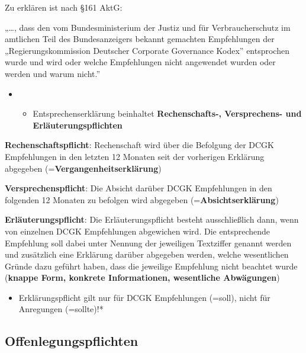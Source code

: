 \documentclass[
]{article}
\providecommand{\tightlist}{%
  \setlength{\itemsep}{0pt}\setlength{\parskip}{0pt}}
\begin{document}
Zu erklären ist nach §161 AktG:

„\ldots, dass den vom Bundesministerium der Justiz und für
Verbraucherschutz im amtlichen Teil des Bundesanzeigers bekannt
gemachten Empfehlungen der „Regierungskommission Deutscher Corporate
Governance Kodex'' entsprochen wurde und wird oder welche Empfehlungen
nicht angewendet wurden oder werden und warum nicht.''

\begin{itemize}
\item
  \begin{itemize}
  \tightlist
  \item
    Entsprechenserklärung beinhaltet \textbf{Rechenschafts-,
    Versprechens- und Erläuterungspflichten}
  \end{itemize}
\end{itemize}

\textbf{Rechenschaftspflicht}: Rechenschaft wird über die Befolgung der
DCGK Empfehlungen in den letzten 12 Monaten seit der vorherigen
Erklärung abgegeben (=\textbf{Vergangenheitserklärung})

\textbf{Versprechenspflicht}: Die Absicht darüber DCGK Empfehlungen in
den folgenden 12 Monaten zu befolgen wird abgegeben
(=\textbf{Absichtserklärung})

\textbf{Erläuterungspflicht}: Die Erläuterungspflicht besteht
ausschließlich dann, wenn von einzelnen DCGK Empfehlungen abgewichen
wird. Die entsprechende Empfehlung soll dabei unter Nennung der
jeweiligen Textziffer genannt werden und zusätzlich eine Erklärung
darüber abgegeben werden, welche wesentlichen Gründe dazu geführt haben,
dass die jeweilige Empfehlung nicht beachtet wurde (\textbf{knappe Form,
konkrete Informationen, wesentliche Abwägungen})

\begin{itemize}
\tightlist
\item
  Erklärungspflicht gilt nur für DCGK Empfehlungen (=soll), nicht für
  Anregungen (=sollte)!*
\end{itemize}

\hypertarget{offenlegungspflichten}{%
\subsection{Offenlegungspflichten}\label{offenlegungspflichten}}
\end{document}
